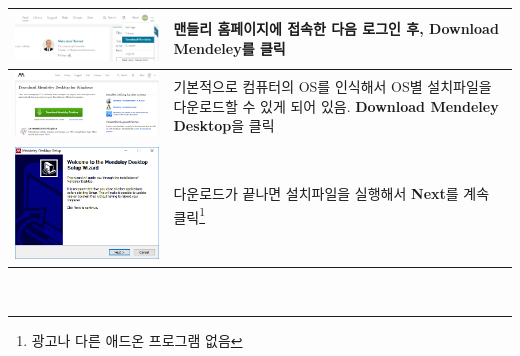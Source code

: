 \documentclass[11pt]{article}
\begin{document}
\begin{tabular}{ m{11cm} m{50mm} }
	\hline
		\includegraphics[width=10cm]{./image/desktop1.png}
	 & 맨들리 홈페이지에 접속한 다음 로그인 후, \textbf{Download Mendeley}를 클릭  \\
	\hline
	\includegraphics[width=10cm]{./image/desktop2.png} & 기본적으로 컴퓨터의 OS를 인식해서 OS별 설치파일을 다운로드할 수 있게 되어 있음. \textbf{Download Mendeley Desktop}을 클릭 \\
	\hline
	\centering
	\includegraphics[width=7cm]{./image/desktop3.png} & 다운로드가 끝나면 설치파일을 실행해서 \textbf{Next}를 계속 클릭\footnote{광고나 다른 애드온 프로그램 없음} \\
\end{tabular} \\
\end{document}
